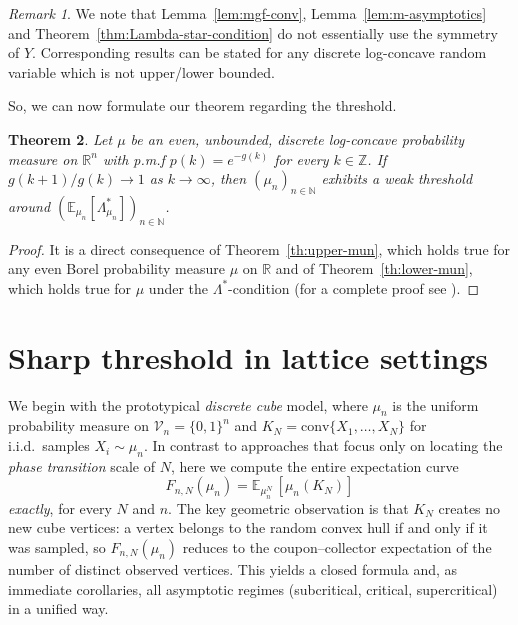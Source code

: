 \documentclass[11pt,a4paper]{article} %
\newtheorem{theorem}{Theorem}[section]
\theoremstyle{definition}
\theoremstyle{remark}
\newtheorem{remark}[theorem]{Remark}
\newcommand{\E}{\mathbb{E}}
\newcommand{\conv}{\mathrm{conv}}
\newcommand{\1}{\mathds{1}}
\begin{document}
\begin{remark}
    We note that Lemma~\ref{lem:mgf-conv}, Lemma~\ref{lem:m-asymptotics} and Theorem~\ref{thm:Lambda-star-condition} do not essentially use the symmetry of $Y$. Corresponding results can be stated for any discrete log-concave random variable which is not upper/lower bounded.

\end{remark}

So, we can now formulate our theorem regarding the threshold. 

\begin{theorem}
Let $\mu$ be an even, unbounded, discrete log-concave probability measure on $\mathbb{R}^n$ with p.m.f $p(k)=e^{-g(k)}$ for every $k \in \mathbb{Z}$. If $g(k+1)/g(k) \to 1$ as $k \to \infty$, then $(\mu_n)_{n \in \mathbb{N}}$ exhibits a weak threshold around $({\mathbb E}_{\mu_n}[\Lambda_{\mu_n}^{\ast}])_{n \in \mathbb{N}}$.
\end{theorem}

\begin{proof}
    It is a direct consequence of Theorem~\ref{th:upper-mun}, which holds true for any even Borel probability measure $\mu$ on $\mathbb{R}$ and of Theorem~\ref{th:lower-mun}, which holds true for $\mu$ under the $\Lambda^\ast$-condition (for a complete proof see \cite[Theorem 3.9]{Paf}).
\end{proof}




\section{Sharp threshold in lattice settings}
We begin with the prototypical \emph{discrete cube} model, where $\mu_n$ is the uniform probability measure on
$\mathcal V_n=\{0,1\}^n$ and $K_N=\conv\{X_1,\dots,X_N\}$ for i.i.d.\ samples $X_i\sim\mu_n$.
In contrast to approaches that focus only on locating the \emph{phase transition} scale of $N$,
here we compute the entire expectation curve
\[
F_{n,N}(\mu_n)=\E_{\mu_n^N}\,[\mu_n(K_N)]
\]
\emph{exactly}, for every $N$ and $n$.
The key geometric observation is that $K_N$ creates no new cube vertices:
a vertex belongs to the random convex hull if and only if it was sampled, so $F_{n,N}(\mu_n)$ reduces to the coupon--collector
expectation of the number of distinct observed vertices. This yields a closed formula and, as immediate corollaries,
all asymptotic regimes (subcritical, critical, supercritical) in a unified way.
\end{document}
